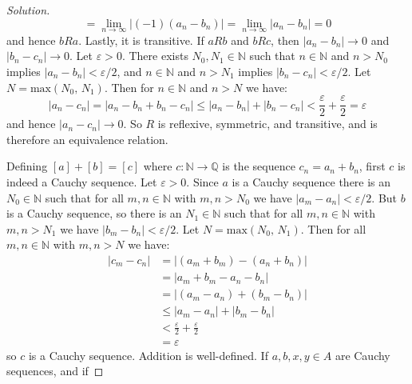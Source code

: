 \documentclass{article}
\theoremstyle{normal}
\begin{document}
\begin{proof}[Solution]
\begin{equation}
            =\lim_{n\rightarrow\infty}|(-1)(a_{n}-b_{n})|
            =\lim_{n\rightarrow\infty}|a_{n}-b_{n}|
            =0
        \end{equation}
        and hence $bRa$. Lastly, it is transitive. If $aRb$ and $bRc$, then
        $|a_{n}-b_{n}|\rightarrow{0}$ and $|b_{n}-c_{n}|\rightarrow{0}$.
        Let $\varepsilon>0$. There exists $N_{0},N_{1}\in\mathbb{N}$ such that
        $n\in\mathbb{N}$ and $n>N_{0}$ implies
        $|a_{n}-b_{n}|<\varepsilon/2$, and $n\in\mathbb{N}$ and $n>N_{1}$
        implies $|b_{n}-c_{n}|<\varepsilon/2$. Let
        $N=\textrm{max}(N_{0},\,N_{1})$. Then for $n\in\mathbb{N}$ and $n>N$
        we have:
        \begin{equation}
            |a_{n}-c_{n}|
            =|a_{n}-b_{n}+b_{n}-c_{n}|
            \leq|a_{n}-b_{n}|+|b_{n}-c_{n}|
            <\frac{\varepsilon}{2}+\frac{\varepsilon}{2}
            =\varepsilon
        \end{equation}
        and hence $|a_{n}-c_{n}|\rightarrow{0}$. So $R$ is reflexive, symmetric,
        and transitive, and is therefore an equivalence relation.
        \par\hfill\par
        Defining $[a]+[b]=[c]$ where $c:\mathbb{N}\rightarrow\mathbb{Q}$ is the
        sequence $c_{n}=a_{n}+b_{n}$, first $c$ is indeed a Cauchy sequence.
        Let $\varepsilon>0$. Since $a$ is a Cauchy sequence there is an
        $N_{0}\in\mathbb{N}$ such that for all $m,n\in\mathbb{N}$ with
        $m,n>N_{0}$ we have $|a_{m}-a_{n}|<\varepsilon/2$. But $b$ is a Cauchy
        sequence, so there is an $N_{1}\in\mathbb{N}$ such that for all
        $m,n\in\mathbb{N}$ with $m,n>N_{1}$ we have
        $|b_{m}-b_{n}|<\varepsilon/2$. Let $N=\textrm{max}(N_{0},\,N_{1})$.
        Then for all $m,n\in\mathbb{N}$ with $m,n>N$ we have:
        \begin{align}
            |c_{m}-c_{n}|
            &=|(a_{m}+b_{m})-(a_{n}+b_{n})|\\
            &=|a_{m}+b_{m}-a_{n}-b_{n}|\\
            &=|(a_{m}-a_{n})+(b_{m}-b_{n})|\\
            &\leq|a_{m}-a_{n}|+|b_{m}-b_{n}|\\
            &<\frac{\varepsilon}{2}+\frac{\varepsilon}{2}\\
            &=\varepsilon
        \end{align}
        so $c$ is a Cauchy sequence. Addition is well-defined. If
        $a,b,x,y\in{A}$ are Cauchy sequences, and if

\end{proof}
\end{document}
